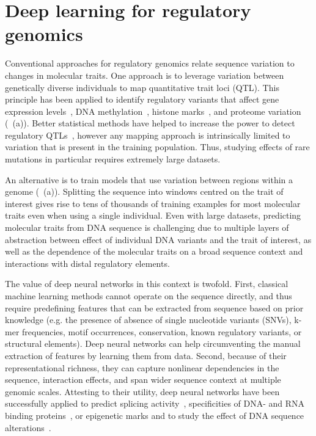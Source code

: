 \section{Deep learning for regulatory genomics} \label{sec:dl_genomics}

Conventional approaches for regulatory genomics relate sequence variation to changes in molecular traits. One approach is to leverage variation between genetically diverse individuals to map quantitative trait loci (QTL). This principle has been applied to identify regulatory variants that affect gene expression levels~\citep{montgomery_transcriptome_2010,pickrell_understanding_2010}, DNA methylation~\citep{bell_dna_2011,gibbs_abundant_2010}, histone marks~\citep{grubert_genetic_2015,waszak_population_2015}, and proteome variation~\citep{albert_genetics_2014,battle_genomic_2015,parts_heritability_2014,vincent_stacked_2010} (~(a)). Better statistical methods have helped to increase the power to detect regulatory QTLs~\citep{kang_accurate_2008,parts_joint_2011,rakitsch_modelling_2016,stegle_bayesian_2010}, however any mapping approach is intrinsically limited to variation that is present in the training population. Thus, studying effects of rare mutations in particular requires extremely large datasets.

An alternative is to train models that use variation between regions within a genome (~(a)). Splitting the sequence into windows centred on the trait of interest gives rise to tens of thousands of training examples for most molecular traits even when using a single individual. Even with large datasets, predicting molecular traits from DNA sequence is challenging due to multiple layers of abstraction between effect of individual DNA variants and the trait of interest, as well as the dependence of the molecular traits on a broad sequence context and interactions with distal regulatory elements.

The value of deep neural networks in this context is twofold. First, classical machine learning methods cannot operate on the sequence directly, and thus require predefining features that can be extracted from sequence based on prior knowledge (e.g. the presence of absence of single nucleotide variants (SNVs), k-mer frequencies, motif occurrences, conservation, known regulatory variants, or structural elements). Deep neural networks can help circumventing the manual extraction of features by learning them from data. Second, because of their representational richness, they can capture nonlinear dependencies in the sequence, interaction effects, and span wider sequence context at multiple genomic scales. Attesting to their utility, deep neural networks have been successfully applied to predict splicing activity~\citep{leung_deep_2014,xiong_human_2015}, specificities of DNA- and RNA binding proteins~\citep{alipanahi_predicting_2015}, or epigenetic marks and to study the effect of DNA sequence alterations~\citep{kelley_basset:_2016,zhou_predicting_2015}.

